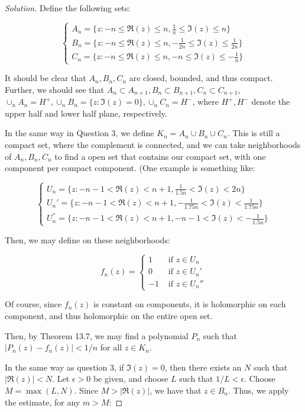 \documentclass[10pt]{article}
\begin{document}
\begin{proof}[Solution]

Define the following sets:

$$\begin{cases} A_n = \{ z :  -n \leq \Re(z) \leq n, \frac{1}{n} \leq \Im(z) \leq n \} \\ B_n = \{ z :   -n \leq \Re(z) \leq n, -\frac{1}{2n} \leq \Im(z) \leq \frac{1}{2n} \} \\ C_n = \{  z :  -n \leq \Re(z) \leq n, -n \leq \Im(z) \leq -\frac{1}{n} \}\end{cases}$$

It should be clear that $A_n, B_n, C_n$ are closed, bounded, and thus compact. Further, we should see that $A_n \subset A_{n+1}, B_n \subset B_{n+1}, C_n \subset C_{n+1}$, $\cup_n A_n =   H^+, \cup_n B_n = \{ z : \Im(z) = 0 \}, \cup_n C_n  = H^-$, where $H^+, H^-$ denote the upper half and lower half plane, respectively.

In the same way in Question 3, we define $K_n = A_n \cup B_n \cup C_n$. This is still a compact set, where the complement is connected, and we can take neighborhoods of $A_n, B_n, C_n$ to find a open set that contains our compact set, with one component per compact component. (One example is something like:

$$ \begin{cases}U_n =  \{ z : -n - 1 < \Re(z) < n+1, \frac{1}{1.5n} < \Im(z) < 2n \} \\ U_n' =   \{ z :   -n-1 < \Re(z) < n+1, -\frac{1}{1.75n} < \Im(z) < \frac{1}{1.75n} \} \\ U_n^{''} =  \{  z :  -n-1 < \Re(z) < n +1, -n-1 < \Im(z) < -\frac{1}{1.5n} \} \end{cases} $$

Then, we may define on these neighborhoods:

$$f_n(z) = \begin{cases} 1 & \text{ if } z \in U_n \\  0 & \text{ if } z \in U_n' \\ -1 & \text{ if } z \in U_n{''} \end{cases}$$

Of course, since $f_n(z)$ is constant on components, it is holomorphic on each component, and thus holomorphic on the entire open set.

Then, by Theorem 13.7, we may find a polynomial $P_n$ such that $| P_n(z) - f_n(z) | < 1/n$ for all $z \in K_n$. 

In the same way as question 3, if $\Im(z)  = 0$, then there exists an $N$ such that $|\Re(z)| < N$. Let $\epsilon > 0$ be given, and choose $L$ such that $1/L < \epsilon$. Choose $M = \max(L,N)$. Since $M > | \Re(z)|$, we have that $z \in B_n$. Thus, we apply the estimate, for any $m > M$:


\end{proof}
\end{document}
